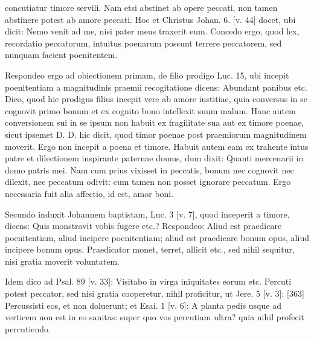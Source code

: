 concutiatur timore servili. Nam etsi abstinet ab opere peccati, non tamen abstinere potest ab amore peccati. Hoc et Christus Johan. 6. [v. 44] docet, ubi dicit: Nemo venit ad me, nisi pater meus traxerit eum. Concedo ergo, quod lex, recordatio peccatorum, intuitus poenarum possunt terrere peccatorem, sed nunquam facient poenitentem.

Respondeo ergo ad obiectionem primam, de filio prodigo Luc. 15, ubi incepit poenitentiam a magnitudinis praemii recogitatione dicens: Abundant panibus etc. Dico, quod hic prodigus filius incepit vere ab amore iustitiae, quia conversus in se cognovit primo bonum et ex cognito bono intellexit suum malum. Hanc autem conversionem sui in se ipsum non habuit ex fragilitate sua aut ex timore poenae, sicut ipsemet D. D. hic dicit, quod timor poenae post praemiorum magnitudinem moverit. Ergo non incepit a poena et timore. Habuit autem eam ex trahente intus patre et dilectionem inspirante paternae domus, dum dixit: Quanti mercenarii in domo patris mei. Nam cum prius vixisset in peccatis, bonum nec cognovit nec dilexit, nec peccatum odivit: cum tamen non posset ignorare peccatum. Ergo necessaria fuit alia affectio, id est, amor boni.

Secundo induxit Johannem baptistam, Luc. 3 [v. 7], quod inceperit a timore, dicens: Quis monstravit vobis fugere etc.? Respondeo: Aliud est praedicare poenitentiam, aliud incipere poenitentiam; aliud est praedicare bonum opus, aliud incipere bonum opus. Praedicator monet, terret, allicit etc., sed nihil sequitur, nisi gratia moverit voluntatem.

Idem dico ad Psal. 89 [v. 33]: Visitabo in virga iniquitates eorum etc. Percuti potest peccator, sed nisi gratia cooperetur, nihil proficitur, ut Jere. 5 [v. 3]: [363] Percussisti eos, et non doluerunt; et Esai. 1 [v. 6]: A planta pedis usque ad verticem non est in eo sanitas: super quo vos percutiam ultra? quia nihil profecit percutiendo.

